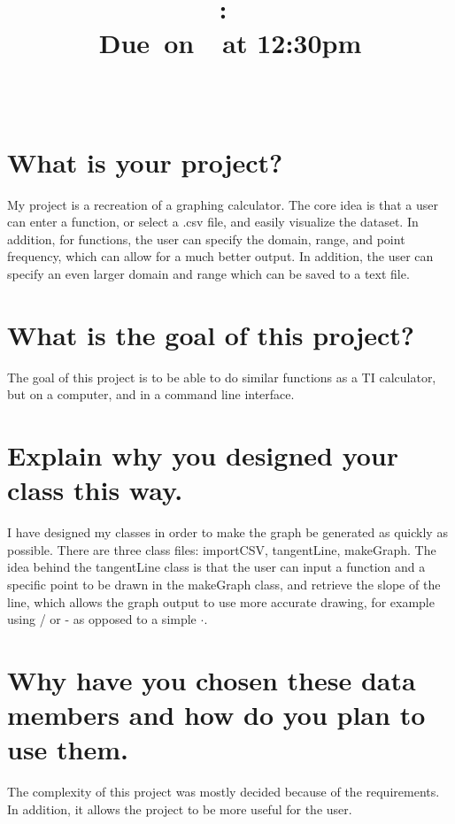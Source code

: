 \documentclass{article}
\title{
    \vspace{2in}
    \textmd{\textbf{\hmwkClass:\ \hmwkTitle}}\\
    \normalsize\vspace{0.1in}\small{Due\ on\ \hmwkDueDate\ at 12:30pm}\\
    \vspace{0.1in}\large{\textit{\hmwkClassInstructor\ \hmwkClassTime}}
    \vspace{3in}
}
\author{\hmwkAuthorName}
\date{}
\begin{document}

\section{What is your project?}

My project is a recreation of a graphing calculator. The core idea is that a user can enter a function, or select a .csv file, and easily visualize the dataset. In addition, for functions, the user can specify the domain, range, and point frequency, which can allow for a much better output. In addition, the user can specify an even larger domain and range which can be saved to a text file.

\section{What is the goal of this project?}

The goal of this project is to be able to do similar functions as a TI calculator, but on a computer, and in a command line interface.

\section{Explain why you designed your class this way.}

I have designed my classes in order to make the graph be generated as quickly as possible. There are three class files: importCSV, tangentLine, makeGraph. The idea behind the tangentLine class is that the user can input a function and a specific point to be drawn in the makeGraph class, and retrieve the slope of the line, which allows the graph output to use more accurate drawing, for example using / or - as opposed to a simple $\cdot$.

\section{Why have you chosen these data members and how do you plan to use them.}

The complexity of this project was mostly decided because of the requirements. In addition, it allows the project to be more useful for the user.
\end{document}

